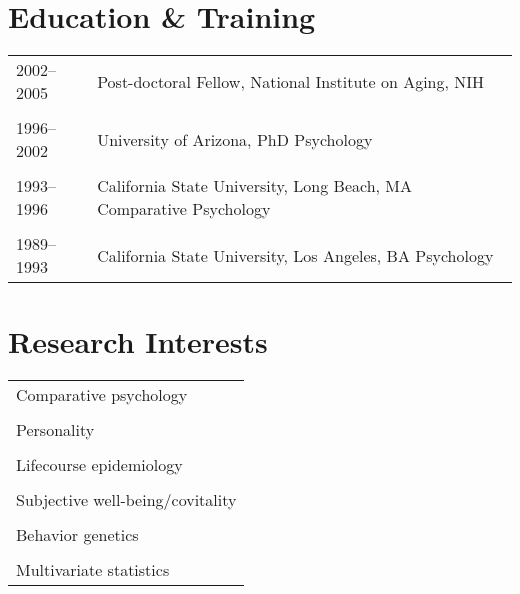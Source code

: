 \documentclass[11pt]{article}
\begin{document}
\section*{Education \& Training}

\begin{tabular}{p{3cm}p{12cm}}
2002--2005 & Post-doctoral Fellow, National Institute on Aging, NIH
\\ \\

1996--2002 & University of Arizona, PhD Psychology
\\ \\

1993--1996 & California State University, Long Beach, MA Comparative
Psychology \\ \\

1989--1993 & California State University, Los Angeles, BA Psychology
\end{tabular}

\section*{Research Interests}
\begin{tabular}{p{15cm}}

Comparative psychology \\ \\

Personality \\ \\

Lifecourse epidemiology \\ \\
  
Subjective well-being/covitality \\ \\

Behavior genetics \\ \\
        
Multivariate statistics

\end{tabular}
\end{document}
